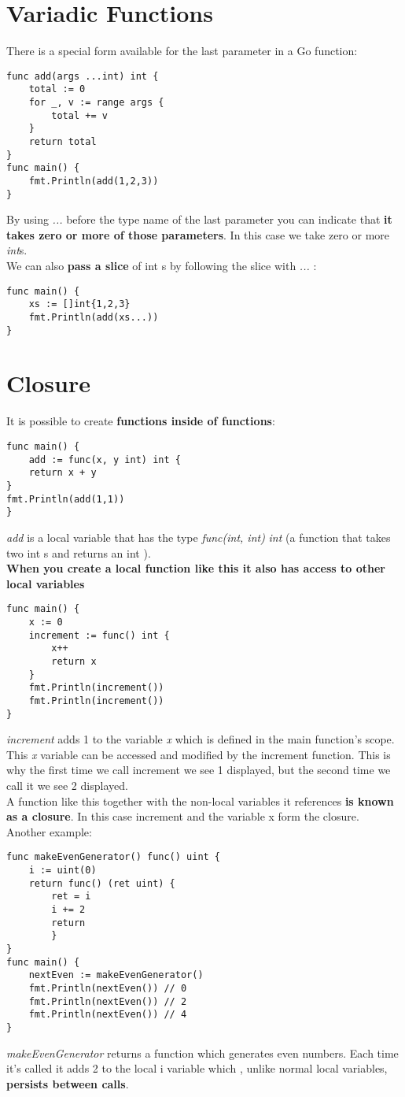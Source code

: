\documentclass[10pt,letterpaper]{report}
\begin{document}
\section{Variadic Functions}
There is a special form available for the last parameter in a Go function:
\begin{lstlisting}
func add(args ...int) int {
	total := 0
	for _, v := range args {
		total += v
	}
	return total
}
func main() {
	fmt.Println(add(1,2,3))
}
\end{lstlisting}
By using \textit{...} before the type name of the last parameter you can indicate that \textbf{it takes zero or more of those parameters}. In this case we take zero or more \textit{int}s.\\
We can also \textbf{pass a slice} of int s by following the slice with \textit{...} :
\begin{lstlisting}
func main() {
	xs := []int{1,2,3}
	fmt.Println(add(xs...))
}
\end{lstlisting}
\section{Closure}
It is possible to create \textbf{functions inside of functions}:
\begin{lstlisting}
func main() {
	add := func(x, y int) int {
	return x + y
}
fmt.Println(add(1,1))
}
\end{lstlisting}
\textit{add} is a local variable that has the type \textit{func(int, int)} \textit{int} (a function that takes two int s and returns an int ).\\ 
\textbf{When you create a local function like this it also has access to other local variables}
\begin{lstlisting}
func main() {
	x := 0
	increment := func() int {
		x++
		return x
	}
	fmt.Println(increment())
	fmt.Println(increment())
}
\end{lstlisting}
\textit{increment} adds 1 to the variable \textit{x} which is defined in the main function's scope. This \textit{x} variable can be accessed and modified by the increment function. This is why the first time we call increment we see 1 displayed, but the second time we call it we see 2 displayed.\\
A function like this together with the non-local variables it references \textbf{is known as a closure}. In this case increment and the variable x form the closure.\\
Another example:
\begin{lstlisting}
func makeEvenGenerator() func() uint {
	i := uint(0)
	return func() (ret uint) {
		ret = i
		i += 2
		return
		}
}
func main() {
	nextEven := makeEvenGenerator()
	fmt.Println(nextEven()) // 0
	fmt.Println(nextEven()) // 2
	fmt.Println(nextEven()) // 4
}
\end{lstlisting}
\textit{makeEvenGenerator} returns a function which generates even numbers. Each time it's called it adds 2 to the local i variable which , unlike normal local variables, \textbf{persists between calls}.
\end{document}
